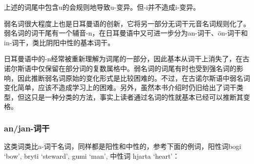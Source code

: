 上述的词尾中包含u的会规则地导致u-变异。但-i并不造成i-变异。

弱名词很大程度上也是日耳曼语的创新，它将另一部分无词干元音名词规则化了。弱名词的词干尾有一个辅音-n，在日耳曼语中又可进一步分为an-词干、ōn-词干和in-词干，类比阴阳中性的基本词干。

日耳曼语中的-n经常被重新理解为词尾的一部分，因此基本从词干上消失了，在古诺尔斯语中仅保留在部分词的复数属格中。弱名词的词尾有时也受到强名词的影响，因此推断弱名词原始的变化形式是比较困难的。不过，在古诺尔斯语中弱名词变化简单，应该不造成学习上的困难。另外，虽然本书介绍时仍旧给出了词干类型，但这只是一种分类的方法，事实上读者通过名词的性就基本已经可以推断其变格。

\subsubsection{an/jan-词干}\label{anjan-ux8bcdux5e72}

这类词类比a-词干名词，同样都是阳性和中性的，参考下面的例词，阳性词bogi
`bow', bryti `steward', gumi `man', 中性词 hjarta `heart'：

